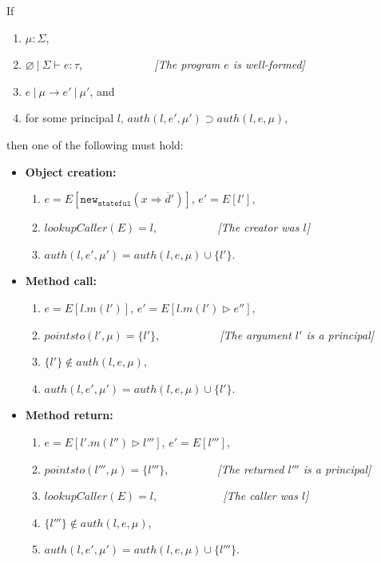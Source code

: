 \documentclass{llncs}
\newcommand{\keywadj}[1]{\mathtt{#1}}
\begin{document}
\begin{theorem} If
\begin{enumerate}
\item $\mu : \Sigma$,
\item $\varnothing~|~\Sigma \vdash e : \tau$, {\emph{~~~~~~~~~~~~[The program $e$ is well-formed]}}
\item $e~|~\mu \longrightarrow e'~|~\mu'$, and
\item for some principal $l$, $auth(l, e', \mu') \supset auth(l, e, \mu)$,
\end{enumerate}
then one of the following must hold:
\begin{itemize}
  \item \textbf{Object creation:}
  \begin{enumerate}
  \item $e = E[\keywadj{new}_{\keywadj{stateful}}(x \Rightarrow \overline{d}')]$, $e' = E[l']$,
  \item $lookupCaller(E) = l$, {\emph{~~~~~~~~~~[The creator was $l$]}}
  \item $auth(l, e', \mu') = auth(l, e, \mu) \cup \{ l' \}$.\\
  \end{enumerate}
  \item \textbf{Method call:}
  \begin{enumerate}
  \item $e = E[l.m(l')]$, $e' = E[l.m(l') \rhd e'']$,
  \item $pointsto(l',\mu) = \{ l' \}$, {\emph{~~~~~~~~~~[The argument $l'$ is a principal]}}
  \item $\{ l' \} \not\in auth(l, e, \mu)$,
  \item $auth(l, e', \mu') = auth(l, e, \mu) \cup \{ l' \}$.\\
  \end{enumerate}
  \item \textbf{Method return:}
  \begin{enumerate}
  \item $e = E[l'.m(l'') \rhd l''']$, $e' = E[l''']$,
  \item $pointsto(l''',\mu) = \{ l''' \}$, {\emph{~~~~~~~~[The returned $l'''$ is a principal]}}
  \item $lookupCaller(E) = l$, {\emph{~~~~~~~~~~~[The caller was $l$]}}
  \item $\{ l''' \} \not\in auth(l, e, \mu)$,
  \item $auth(l, e', \mu') = auth(l, e, \mu) \cup \{ l''' \}$.\\
  \end{enumerate}
\end{itemize}

\end{theorem}
\end{document}
